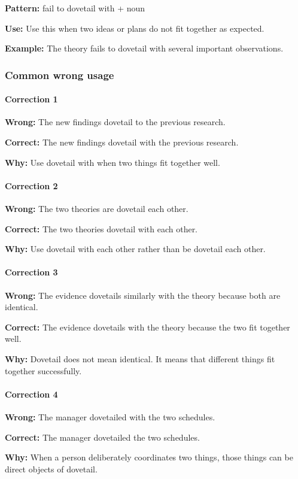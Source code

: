 \documentclass[11pt]{article}
\begin{document}
\textbf{Pattern:} fail to dovetail with + noun

\textbf{Use:} Use this when two ideas or plans do not fit together as expected.

\textbf{Example:} The theory fails to dovetail with several important observations.

\subsubsection{Common wrong usage}
\paragraph{Correction 1}
\textbf{Wrong:} The new findings dovetail to the previous research.

\textbf{Correct:} The new findings dovetail with the previous research.

\textbf{Why:} Use dovetail with when two things fit together well.

\paragraph{Correction 2}
\textbf{Wrong:} The two theories are dovetail each other.

\textbf{Correct:} The two theories dovetail with each other.

\textbf{Why:} Use dovetail with each other rather than be dovetail each other.

\paragraph{Correction 3}
\textbf{Wrong:} The evidence dovetails similarly with the theory because both are identical.

\textbf{Correct:} The evidence dovetails with the theory because the two fit together well.

\textbf{Why:} Dovetail does not mean identical. It means that different things fit together successfully.

\paragraph{Correction 4}
\textbf{Wrong:} The manager dovetailed with the two schedules.

\textbf{Correct:} The manager dovetailed the two schedules.

\textbf{Why:} When a person deliberately coordinates two things, those things can be direct objects of dovetail.
\end{document}
